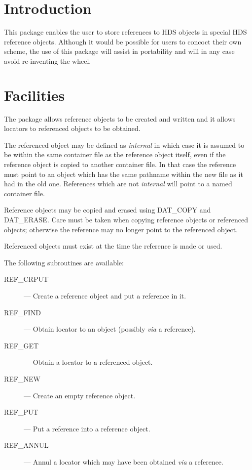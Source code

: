 \documentclass[twoside,11pt,nolof]{starlink}
\begin{document}
\scfrontmatter


\section{Introduction}
\label{introduction}

This package enables the user to store references to HDS objects in
special HDS reference objects.  Although it would be possible for users
to concoct their own scheme, the use of this package will assist in
portability and will in any case avoid re-inventing the wheel.

\section{Facilities}
\label{facilities}

The package allows reference objects to be created and written and it
allows locators to referenced objects to be obtained.

The referenced object may be defined as \emph{internal\/} in which case
it is assumed to be within the same container file as the reference
object itself, even if the reference object is copied to another
container file.  In that case the reference must point to an object
which has the same pathname within the new file as it had in the old
one.  References which are not \emph{internal\/} will point to a named
container file.

Reference objects may be copied and erased using DAT\_COPY and
DAT\_ERASE\@.  Care must be taken when copying reference objects or
referenced objects; otherwise the reference may no longer point to the
referenced object.

Referenced objects must exist at the time the reference is made or used.

The following subroutines are available:
\begin{description}
\item [REF\_CRPUT] --- Create a reference object and put a reference in it.
\item [REF\_FIND] --- Obtain locator to an object (possibly \emph{via} a
reference).
\item [REF\_GET] --- Obtain a locator to a referenced object.
\item [REF\_NEW] --- Create an empty reference object.
\item [REF\_PUT] --- Put a reference into a reference object.
\item [REF\_ANNUL] --- Annul a locator which may have been obtained
\emph{via} a reference.
\end{description}
\end{document}
